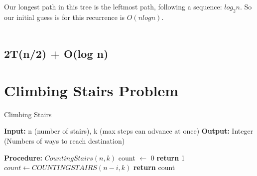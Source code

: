 \documentclass[10pt,letterpaper]{article}
\begin{document}
\noindent Our longest path in this tree is the leftmost path, following a sequence: $log_{2}n$. So our initial guess is for this recurrence is $O(nlogn)$.\\
\\


\subsection{2T(n/2) + O(log n)}


\section{Climbing Stairs Problem}


\begin{algorithm}
\caption{Climbing Stairs}\label{euclid}
\begin{algorithmic}[1]
\State \textbf{Input:} n (number of stairs), k (max steps can advance at once)
\State \textbf{Output:} Integer (Numbers of ways to reach destination)

\State \textbf{Procedure:} $CountingStairs(n, k)$
\State count $\leftarrow$ 0
	\State \textbf{return} 1
\EndIf
{} 
	\State $count \leftarrow COUNTINGSTAIRS(n-i, k)$
\EndFor
\State \textbf{return} count


\end{algorithmic}
\end{algorithm}
\end{document}
